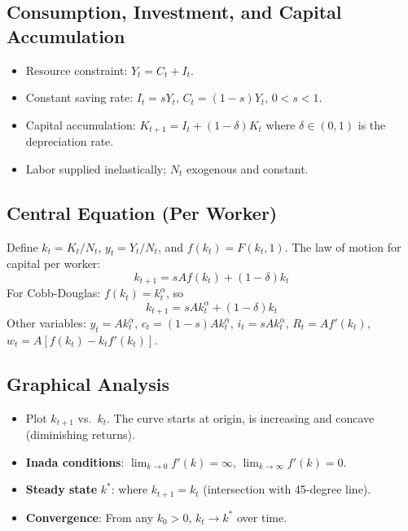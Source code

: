 \documentclass[12pt]{article}
\begin{document}
\subsection{Consumption, Investment, and Capital Accumulation}
\begin{itemize}
    \item Resource constraint: $Y_t = C_t + I_t$.
    \item Constant saving rate: $I_t = s Y_t$, $C_t = (1-s) Y_t$, $0 < s < 1$.
    \item Capital accumulation: $K_{t+1} = I_t + (1-\delta) K_t$ where $\delta \in (0,1)$ is the depreciation rate.
    \item Labor supplied inelastically; $N_t$ exogenous and constant.
\end{itemize}

\subsection{Central Equation (Per Worker)}
Define $k_t = K_t / N_t$, $y_t = Y_t / N_t$, and $f(k_t) = F(k_t, 1)$. The law of motion for capital per worker:
\begin{equation}
    k_{t+1} = s A f(k_t) + (1-\delta) k_t
\end{equation}
For Cobb-Douglas: $f(k_t) = k_t^{\alpha}$, so
\begin{equation}
    k_{t+1} = s A k_t^{\alpha} + (1-\delta) k_t
\end{equation}
Other variables: $y_t = A k_t^{\alpha}$, $c_t = (1-s) A k_t^{\alpha}$, $i_t = s A k_t^{\alpha}$, $R_t = A f'(k_t)$, $w_t = A[f(k_t) - k_t f'(k_t)]$.

\subsection{Graphical Analysis}
\begin{itemize}
    \item Plot $k_{t+1}$ vs.\ $k_t$. The curve starts at origin, is increasing and concave (diminishing returns).
    \item \textbf{Inada conditions}: $\lim_{k \to 0} f'(k) = \infty$, $\lim_{k \to \infty} f'(k) = 0$.
    \item \textbf{Steady state} $k^*$: where $k_{t+1} = k_t$ (intersection with 45-degree line).
    \item \textbf{Convergence}: From any $k_0 > 0$, $k_t \to k^*$ over time.
\end{itemize}
\end{document}
